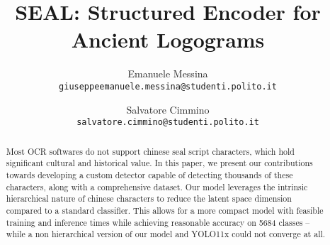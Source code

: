 \documentclass[10pt,twocolumn,letterpaper]{article}
\begin{document}
\title{SEAL: Structured Encoder for Ancient Logograms}

\author{Emanuele Messina\\
{\tt\small giuseppeemanuele.messina@studenti.polito.it}
\and
Salvatore Cimmino\\
{\tt\small salvatore.cimmino@studenti.polito.it}
}

\maketitle

\begin{abstract}
  Most OCR softwares do not support chinese seal script characters, which hold significant cultural and historical value. In this paper, we present our contributions towards developing a custom detector capable of detecting thousands of these characters, along with a comprehensive dataset. Our model leverages the intrinsic hierarchical nature of chinese characters to reduce the latent space dimension compared to a standard classifier. This allows for a more compact model with feasible training and inference times while achieving reasonable accuracy on 5684 classes -- while a non hierarchical version of our model and YOLO11x could not converge at all.
\end{abstract}








{\small
  
  
}
\end{document}
